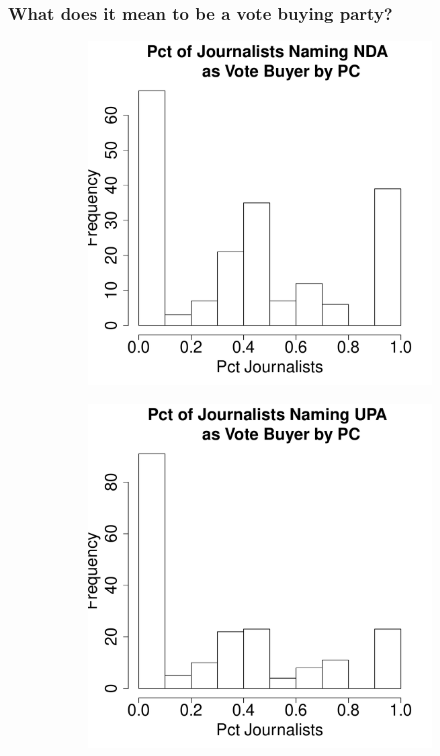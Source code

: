 \documentclass{beamer}
\begin{document}
\begin{frame}
\frametitle{What does it mean to be a vote buying party?}

\begin{figure}
\begin{subfigure}{0.45\textwidth}
\centering
\includegraphics[width=1\textwidth]{../Figures/journalist_concurrence_nda}
\end{subfigure}%
\begin{subfigure}{0.45\textwidth}
\centering
\includegraphics[width=1\textwidth]{../Figures/journalist_concurrence_upa}
\end{subfigure}
\end{figure}

\end{frame}
\end{document}
